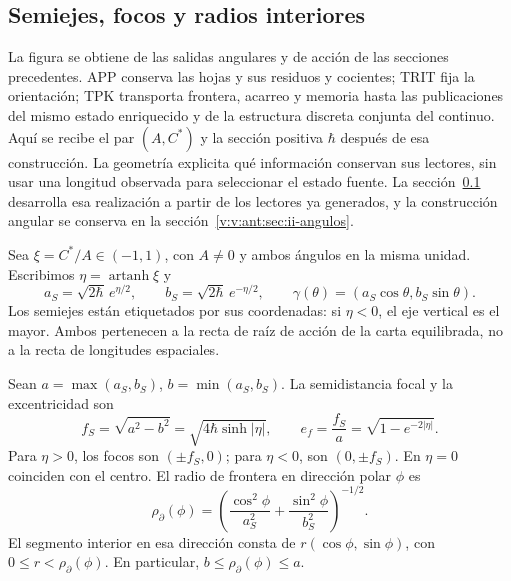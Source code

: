 
\subsection{Semiejes, focos y radios interiores}
\label{ii:sec:ii-elipse-geometria}

La figura se obtiene de las salidas angulares y de acción de las secciones
precedentes. APP conserva las hojas y sus residuos y cocientes; TRIT fija
la orientación; TPK transporta frontera, acarreo y memoria hasta las
publicaciones del mismo estado enriquecido y de la estructura discreta
conjunta del continuo. Aquí se recibe el par \((A,C^*)\) y la sección
positiva \(\hbar\) después de esa construcción. La geometría explicita
qué información conservan sus lectores, sin usar una longitud observada
para seleccionar el estado fuente. La sección~\ref{ii:sec:ii-elipse-geometria} desarrolla esa realización a partir de los lectores ya generados, y la construcción angular se conserva en la sección~\ref{v:v:ant:sec:ii-angulos}.

Sea \(\xi=C^*/A\in(-1,1)\), con \(A\ne0\) y ambos ángulos en la
misma unidad. Escribimos \(\eta=\operatorname{artanh}\xi\) y
\[
 a_S=\sqrt{2\hbar}\,e^{\eta/2},\qquad
 b_S=\sqrt{2\hbar}\,e^{-\eta/2},\qquad
 \gamma(\theta)=(a_S\cos\theta,b_S\sin\theta).
\]
Los semiejes están etiquetados por sus coordenadas: si \(\eta<0\),
el eje vertical es el mayor. Ambos pertenecen a la recta de raíz de
acción de la carta equilibrada, no a la recta de longitudes espaciales.

\begin{proposition}
\label{ii:prop:ii-elipse-focos}
Sean \(a=\max(a_S,b_S)\), \(b=\min(a_S,b_S)\). La semidistancia
focal y la excentricidad son
\begin{equation}
 f_S=\sqrt{a^2-b^2}
 =\sqrt{4\hbar\sinh|\eta|},\qquad
 e_f=\frac{f_S}{a}=\sqrt{1-e^{-2|\eta|}}.
 \label{ii:eq:ii-elipse-focal}
\end{equation}
Para \(\eta>0\), los focos son \((\pm f_S,0)\); para
\(\eta<0\), son \((0,\pm f_S)\). En \(\eta=0\) coinciden con
el centro. El radio de frontera en dirección polar \(\phi\) es
\begin{equation}
 \rho_{\partial}(\phi)
 =\left(\frac{\cos^2\phi}{a_S^2}
        +\frac{\sin^2\phi}{b_S^2}\right)^{-1/2}.
 \label{ii:eq:ii-elipse-radio-polar}
\end{equation}
El segmento interior en esa dirección consta de
\(r(\cos\phi,\sin\phi)\), con \(0\le r<\rho_{\partial}(\phi)\).
En particular, \(b\le\rho_{\partial}(\phi)\le a\).
\end{proposition}

